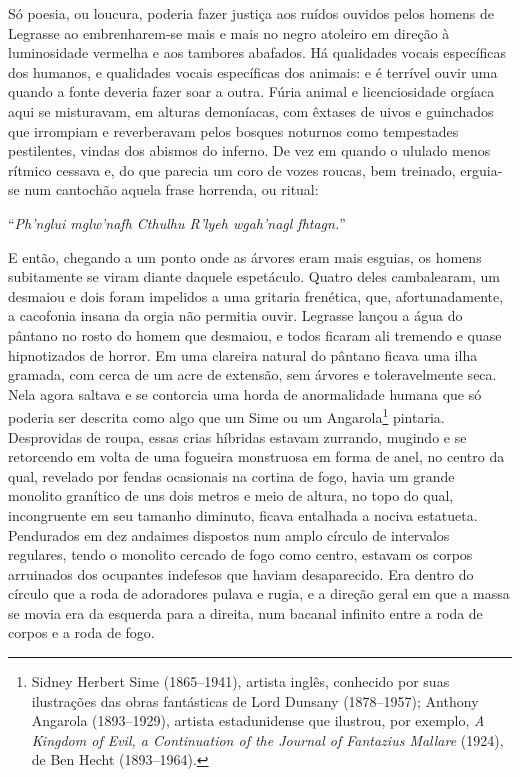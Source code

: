 Só poesia, ou loucura, poderia fazer justiça aos ruídos ouvidos pelos
homens de Legrasse ao embrenharem-se mais e mais no negro atoleiro em
direção à luminosidade vermelha e aos tambores abafados. Há qualidades
vocais específicas dos humanos, e qualidades vocais específicas dos
animais: e é terrível ouvir uma quando a fonte deveria fazer soar a
outra. Fúria animal e licenciosidade orgíaca aqui se misturavam, em
alturas demoníacas, com êxtases de uivos e guinchados que irrompiam e
reverberavam pelos bosques noturnos como tempestades pestilentes, vindas
dos abismos do inferno. De vez em quando o ululado menos rítmico cessava
e, do que parecia um coro de vozes roucas, bem treinado, erguia-se num
cantochão aquela frase horrenda, ou ritual:

``\emph{Ph'nglui mglw'nafh Cthulhu R'lyeh wgah'nagl fhtagn.}''

E então, chegando a um ponto onde as árvores eram mais esguias, os
homens subitamente se viram diante daquele espetáculo. Quatro deles
cambalearam, um desmaiou e dois foram impelidos a uma gritaria
frenética, que, afortunadamente, a cacofonia insana da orgia não
permitia ouvir. Legrasse lançou a água do pântano no rosto do homem que
desmaiou, e todos ficaram ali tremendo e quase hipnotizados de horror.
Em uma clareira natural do pântano ficava uma ilha gramada, com 
cerca de um acre de extensão, sem árvores e toleravelmente seca. Nela
agora saltava e se contorcia uma horda de anormalidade humana que só
poderia ser descrita como algo que um Sime ou um Angarola\footnote{Sidney
  Herbert Sime (1865--1941), artista inglês, conhecido por suas
  ilustrações das obras fantásticas de Lord Dunsany (1878--1957); Anthony
  Angarola (1893--1929), artista estadunidense que ilustrou, por exemplo,
  \emph{A Kingdom of Evil, a Continuation of the Journal of Fantazius
  Mallare} (1924), de Ben Hecht (1893--1964).} pintaria. Desprovidas de
roupa, essas crias híbridas estavam zurrando, mugindo e se retorcendo em
volta de uma fogueira monstruosa em forma de anel, no centro da qual,
revelado por fendas ocasionais na cortina de fogo, havia um grande
monolito granítico de uns dois metros e meio de altura, no topo do qual,
incongruente em seu tamanho diminuto, ficava entalhada a nociva
estatueta. Pendurados em dez andaimes dispostos num amplo círculo de
intervalos regulares, tendo o monolito cercado de fogo como centro,
estavam os corpos arruinados dos ocupantes indefesos que haviam
desaparecido. Era dentro do círculo que a roda de adoradores pulava e
rugia, e a direção geral em que a massa se movia era da esquerda para a
direita, num bacanal infinito entre a roda de corpos e a roda de fogo.

